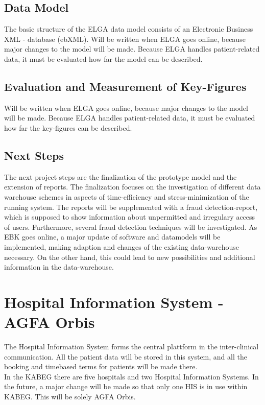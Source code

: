 \documentclass[a4paper]{article}
\begin{document}
	
	
	\subsection{Data Model}
	The basic structure of the ELGA data model consists of an Electronic Business
	XML - database (ebXML).
	Will be written when ELGA goes online, because major
	changes to the model will be made.
	Because ELGA handles patient-related data, it must be evaluated how far the
	model can be described.
	\subsection{Evaluation and Measurement of Key-Figures}
	Will be written when ELGA goes online, because major changes to the model
	will be made. Because ELGA handles patient-related data, it must be evaluated
	how far the key-figures can be described.
	\subsection{Next Steps}
	The next project steps are the finalization of the prototype model and the
	extension of reports. The finalization focuses on the investigation of
	different data warehouse schemes in aspects of time-efficiency and stress-minimization of the running system.
	The reports will be supplemented with a fraud detection-report, which is supposed to 
	show information about unpermitted and irregulary access of users.
	Furthermore, several fraud detection techniques will be investigated. As EBK goes online, a major
	update of software and datamodels will be implemented, making adaption and
	changes of the existing data-warehouse necessary. On the other hand, this could
	lead to new possibilities and additional information in the data-warehouse.
	
	\newpage
	
	\section{Hospital Information System - AGFA Orbis}
	The Hospital Information System forms the central plattform in
	the inter-clinical communication. All the patient data will be stored in this
	system, and all the booking and timebased terms for patients will be made
	there.\\
	In the KABEG there are five hospitals and two Hospital Information
	Systems. In the future, a major change will be made so that only one
	HIS is in use within KABEG. This will be solely AGFA Orbis.
\end{document}
